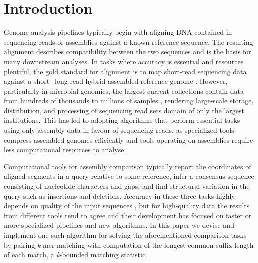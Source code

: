 \documentclass[unnumsec,webpdf,contemporary,large]{oup-authoring-template}%
\theoremstyle{thmstyleone}%
\theoremstyle{thmstyletwo}%
\theoremstyle{thmstylethree}%
\begin{document}

\maketitle


\section{Introduction}
Genome analysis pipelines typically begin with aligning DNA contained in sequencing reads or assemblies against a known reference sequence. The resulting alignment describes compatibility between the two sequences and is the basis for many downstream analyses. In tasks where accuracy is essential and resources plentiful, the gold standard for alignment is to map short-read sequencing data against a short+long read hybrid-assembled reference genome \cite{wick2023assembling}. However, particularly in microbial genomics, the largest current collections contain data from hundreds of thousands to millions of samples \cite{parks2020complete,richardson2023mgnify,hunt2024allthebacteria}, rendering large-scale storage, distribution, and processing of sequencing read sets domain of only the largest institutions. This has led to adopting algorithms that perform essential tasks using only assembly data in favour of sequencing reads, as specialized tools compress assembled genomes efficiently \cite{deorowicz2023agc,bvrinda2024efficient} and tools operating on assemblies require less computational resources to analyse.

Computational tools for assembly comparison typically report the coordinates of aligned segments in a query relative to some reference, infer a consensus sequence consisting of nucleotide characters and gaps, and find structural variation in the query such as insertions and deletions. Accuracy in these three tasks highly depends on quality of the input sequences \cite{wick2025reads}, but for high-quality data the results from different tools tend to agree and their development has focused on faster or more specialized pipelines and new algorithms. In this paper we devise and implement one such algorithm for solving the aforementioned comparison tasks by pairing \emph{k}-mer matching with computation of the longest common suffix length of each match, a \emph{k}-bounded matching statistic.
\end{document}
